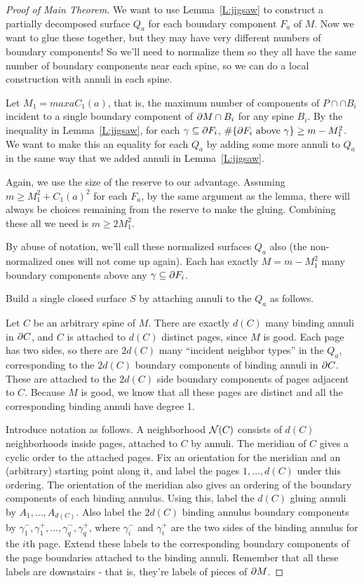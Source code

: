 \begin{proof}[Proof of Main Theorem]

We want to use Lemma~\ref{L:jigsaw} to construct a partially decomposed surface
$Q_a$ for each boundary component $F_a$ of $M$. Now we want to glue these
together, but they may have very different numbers of boundary components! So
we'll need to normalize them so they all have the same number of boundary
components near each spine, so we can do a local construction with annuli in
each spine.

Let $M_1 = max a C_1(a)$, that is, the maximum number of components of $P \cap
\cap B_i$ incident to a single boundary component of $\partial M \cap B_i$ for any
spine $B_i$. By the inequality in Lemma~\ref{L:jigsaw}, for each $\gamma \subseteq
\partial F_i$, $\#\{\partial F_i \text{ above } \gamma\} \geq m - M_1^2$. We want to make
this an equality for each $Q_a$ by adding some more annuli to $Q_a$ in the same
way that we added annuli in Lemma~\ref{L:jigsaw}.

Again, we use the size of the reserve to our advantage. Assuming $m\geq M_1^2
+ C_1(a)^2$ for each $F_a$, by the same argument as the lemma, there will
always be choices remaining from the reserve to make the gluing. Combining
these all we need is $m\geq 2M_1^2$.

By abuse of notation, we'll call these normalized surfaces $Q_a$ also (the
non-normalized ones will not come up again). Each has exactly $M = m - M_1^2$
many boundary components above any $\gamma \subseteq \partial F_i$.

Build a single closed surface $S$ by attaching annuli to the $Q_a$ as follows.

Let $C$ be an arbitrary spine of $M$. There are exactly $d(C)$ many binding
annuli in $\partial C$, and $C$ is attached to $d(C)$ distinct pages, since $M$ is
good. Each page has two sides, so there are $2d(C)$ many ``incident neighbor
types'' in the $Q_a$, corresponding to the $2d(C)$ boundary components of
binding annuli in $\partial C$. These are attached to the $2d(C)$ side boundary
components of pages adjacent to $C$.  Because $M$ is good, we know that all
these pages are distinct and all the corresponding binding annuli have degree
1.

Introduce notation as follows. A neighborhood $\mathcal{N}(C)$ consists of $d(C)$
neighborhoods inside pages, attached to $C$ by annuli. The meridian of $C$
gives a cyclic order to the attached pages.  Fix an orientation for the
meridian and an (arbitrary) starting point along it, and label the pages $1,
\dots, d(C)$ under this ordering.  The orientation of the meridian also gives
an ordering of the boundary components of each binding  annulus.  Using this,
label the $d(C)$ gluing annuli by $A_1,\dots,A_{d(C)}$. Also label the $2d(C)$
binding annulus boundary components by $\gamma_1^-,\gamma_1^+,\dots,
\gamma_q^-,\gamma_q^+$, where $\gamma_i^-$ and $\gamma_i^+$ are the two sides
of the binding annulus for the $i$th page.  Extend these labels to the
corresponding boundary components of the page boundaries attached to the
binding annuli.  Remember that all these labels are downstairs - that is,
they're labels of pieces of $\partial M$.


\end{proof}
